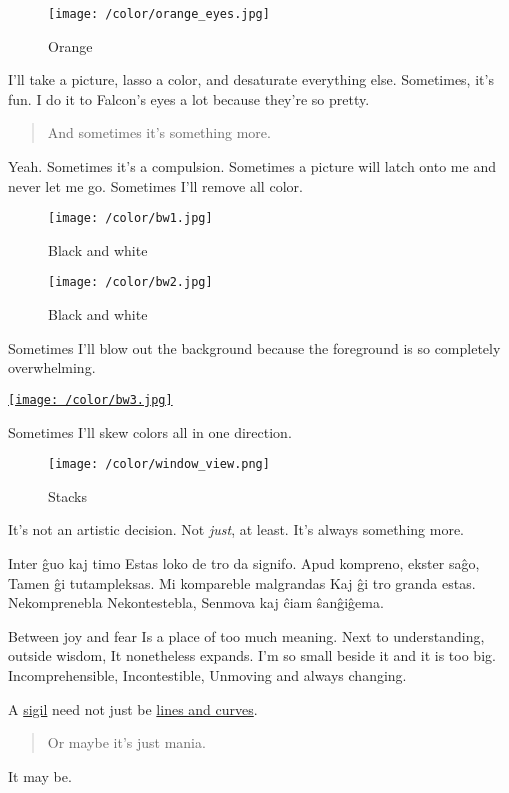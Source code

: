 \begin{figure}
\centering
\texttt{[image: /color/orange\_eyes.jpg]}
\caption{Orange}
\end{figure}

I'll take a picture, lasso a color, and desaturate everything else. Sometimes, it's fun. I do it to Falcon's eyes a lot because they're so pretty.

\begin{quote}
And sometimes it's something more.
\end{quote}

Yeah. Sometimes it's a compulsion. Sometimes a picture will latch onto me and never let me go. Sometimes I'll remove all color.

\begin{figure}
\centering
\texttt{[image: /color/bw1.jpg]}
\caption{Black and white}
\end{figure}

\begin{figure}
\centering
\texttt{[image: /color/bw2.jpg]}
\caption{Black and white}
\end{figure}

Sometimes I'll blow out the background because the foreground is so completely overwhelming.

\href{/manifesto-project}{\texttt{[image: /color/bw3.jpg]}}

Sometimes I'll skew colors all in one direction.

\begin{figure}
\centering
\texttt{[image: /color/window\_view.png]}
\caption{Stacks}
\end{figure}

It's not an artistic decision. Not \emph{just}, at least. It's always something more.

Inter ĝuo kaj timo Estas loko de tro da signifo. Apud kompreno, ekster saĝo, Tamen ĝi tutampleksas. Mi kompareble malgrandas Kaj ĝi tro granda estas. Nekomprenebla Nekontestebla, Senmova kaj ĉiam ŝanĝiĝema.

Between joy and fear Is a place of too much meaning. Next to understanding, outside wisdom, It nonetheless expands. I'm so small beside it and it is too big. Incomprehensible, Incontestible, Unmoving and always changing.

A \href{https://makyo.github.io/tinysigil/}{sigil} need not just be \href{https://makyo.ink/acts-of-intent/}{lines and curves}.

\begin{quote}
Or maybe it's just mania.
\end{quote}

It may be.
